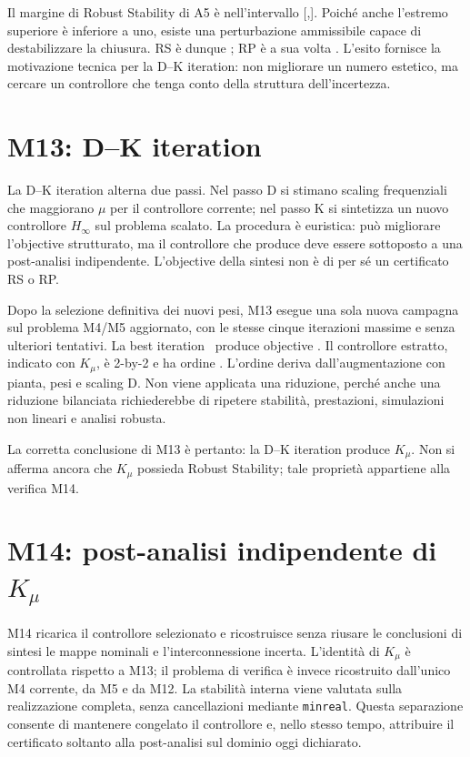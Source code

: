 Il margine di Robust Stability di A5 è nell'intervallo [\AFiveRSLower,\AFiveRSUpper]. Poiché anche l'estremo superiore è inferiore a uno, esiste una perturbazione ammissibile capace di destabilizzare la chiusura. RS è dunque ; RP è a sua volta . L'esito fornisce la motivazione tecnica per la D--K iteration: non migliorare un numero estetico, ma cercare un controllore che tenga conto della struttura dell'incertezza.

\section{M13: D--K iteration}
La D--K iteration alterna due passi. Nel passo D si stimano scaling frequenziali che maggiorano $\mu$ per il controllore corrente; nel passo K si sintetizza un nuovo controllore $H_\infty$ sul problema scalato. La procedura è euristica: può migliorare l'objective strutturato, ma il controllore che produce deve essere sottoposto a una post-analisi indipendente. L'objective della sintesi non è di per sé un certificato RS o RP.

Dopo la selezione definitiva dei nuovi pesi, M13 esegue una sola nuova
campagna sul problema M4/M5 aggiornato, con le stesse cinque iterazioni
massime e senza ulteriori tentativi. La best iteration \BestDKIteration\
produce objective \MusynObjective. Il controllore estratto, indicato con $K_\mu$, è 2-by-2 e ha ordine \KmuOrder. L'ordine deriva dall'augmentazione con pianta, pesi e scaling D. Non viene applicata una riduzione, perché anche una riduzione bilanciata richiederebbe di ripetere stabilità, prestazioni, simulazioni non lineari e analisi robusta.

La corretta conclusione di M13 è pertanto: la D--K iteration produce $K_\mu$. Non si afferma ancora che $K_\mu$ possieda Robust Stability; tale proprietà appartiene alla verifica M14.

\section{M14: post-analisi indipendente di $K_\mu$}
M14 ricarica il controllore selezionato e ricostruisce senza riusare le conclusioni di sintesi le mappe nominali e l'interconnessione incerta. L'identità di $K_\mu$ è controllata rispetto a M13; il problema di verifica è invece ricostruito dall'unico M4 corrente, da M5 e da M12. La stabilità interna viene valutata sulla realizzazione completa, senza cancellazioni mediante \texttt{minreal}. Questa separazione consente di mantenere congelato il controllore e, nello stesso tempo, attribuire il certificato soltanto alla post-analisi sul dominio oggi dichiarato.

